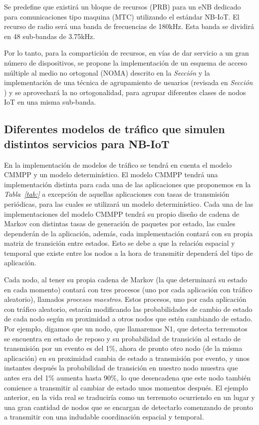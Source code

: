Se predefine que existirá un bloque de recursos (PRB) para un eNB dedicado para comunicaciones tipo maquina (MTC) utilizando el estándar NB-IoT. El recurso de radio será una banda de frecuencias de 180kHz. Esta banda se dividirá en 48 sub-bandas de 3.75kHz.\newline

Por lo tanto, para la compartición de recursos, en vías de dar servicio a un gran número de dispositivos, se propone la implementación de un esquema de acceso múltiple al medio no ortogonal (NOMA) descrito en la \textit{Sección } y la implementación de una técnica de agrupamiento de usuarios (revisada en \textit{Sección }) y se aprovechará la no ortogonalidad, para agrupar diferentes clases de nodos IoT en una misma sub-banda. \newline

\subsection{Diferentes modelos de tráfico que simulen distintos servicios para NB-IoT}

En la implementación de modelos de tráfico se tendrá en cuenta el modelo CMMPP y un modelo determinístico. El modelo CMMPP tendrá una implementación distinta para cada una de las aplicaciones que proponemos en la \textit{Tabla~\ref{tab:} } a excepción de aquellas aplicaciones con tasas de transmisión periódicas, para las cuales se utilizará un modelo determinístico\textit{.} Cada una de las implementaciones del modelo CMMPP tendrá su propio diseño de cadena de Markov con distintas tasas de generación de paquetes por estado, las cuales dependerán de la aplicación, además, cada implementación contará con su propia matriz de transición entre estados. Esto se debe a que la relación espacial y temporal que existe entre los nodos a la hora de transmitir dependerá del tipo de aplicación.

Cada nodo, al tener su propia cadena de Markov (la que determinará su estado en cada momento) contará con tres procesos (uno por cada aplicación con tráfico aleatorio), llamados \textit{procesos maestros}. Estos procesos, uno por cada aplicación con tráfico aleatorio, estarán modificando las probabilidades de cambio de estado de cada nodo según su proximidad a otros nodos que estén cambiando de estado. Por ejemplo, digamos que un nodo, que llamaremos N1, que detecta terremotos se encuentra en estado de reposo y su probabilidad de transición al estado de transmisión por un evento es del 1\%, ahora de pronto otro nodo (de la misma aplicación) en su proximidad cambia de estado a transmisión por evento, y unos instantes después la probabilidad de transición en nuestro nodo muestra que antes era del 1\% aumenta hasta 90\%, lo que desencadena que este nodo también comience a transmitir al cambiar de estado unos momentos después. El ejemplo anterior, en la vida real se traduciría como un terremoto ocurriendo en un lugar y una gran cantidad de nodos que se encargan de detectarlo comenzando de pronto a transmitir con una indudable coordinación espacial y temporal.

